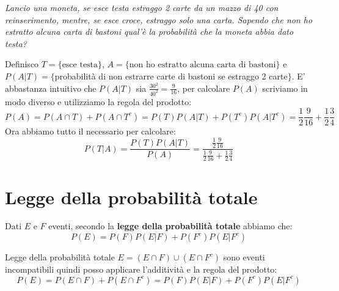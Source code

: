 \begin{Example}{}{}
    \textit{Lancio una moneta, se esce testa estraggo 2 carte da un mazzo di 40 con reinserimento, mentre, se esce croce, estraggo solo una carta. Sapendo che non ho estratto alcuna carta di bastoni qual'è la probabilità che la moneta abbia dato testa?}

    Definisco $T=\{\mbox{esce testa}\}$, $A=\{\mbox{non ho estratto alcuna carta di bastoni}\}$ e $P(A|T)=\{$probabilità di non estrarre carte di bastoni se estraggo 2 carte$\}$. E' abbastanza intuitivo che $P(A|T)$ sia $\frac{30^2}{40^2}=\frac{9}{16}$, per calcolare $P(A)$ scriviamo in modo diverso e utilizziamo la regola del prodotto:
    \begin{equation*}
        P(A)=P(A\cap T)+P(A\cap T^c)=P(T)P(A|T)+P(T^c)P(A|T^c)=\frac{1}{2}\frac{9}{16}+\frac{1}{2}\frac{3}{4}
    \end{equation*}
    Ora abbiamo tutto il necessario per calcolare:
    \begin{equation*}
        P(T|A)=\frac{P(T)P(A|T)}{P(A)}=\frac{\frac{1}{2}\frac{9}{16}}{\frac{1}{2}\frac{9}{16}+\frac{1}{2}\frac{3}{4}}
    \end{equation*}
\end{Example}

\section{Legge della probabilità totale}
\begin{redbar}
    Dati $E$ e $F$ eventi, secondo la \textbf{legge della probabilità totale }abbiamo che:
    \begin{equation*}
        P(E)=P(F)P(E|F)+P(F^c)P(E|F^c)
    \end{equation*}    
\end{redbar}
\begin{Demonstration}{Legge della probabilità totale}{}
    $E=(E\cap F)\cup(E\cap F^c)$ sono eventi incompatibili quindi posso applicare l'additività e la regola del prodotto:
    \begin{equation*}
        P(E)=P(E\cap F)+P(E\cap F^c)=P(F)P(E|F)+P(F^c)P(E|F^c)
    \end{equation*}
\end{Demonstration}

